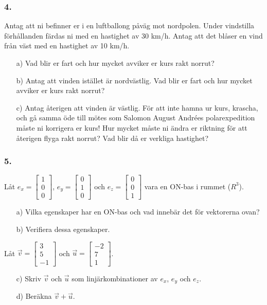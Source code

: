 \documentclass{article}
\begin{document}
\subsubsection*{4.}
Antag att ni befinner er i en luftballong påväg mot nordpolen. Under vindstilla förhållanden färdas ni med en hastighet av 30 km/h. Antag att det blåser en vind från väst med en hastighet av 10 km/h.
\begin{itemize}
\item[a) ] Vad blir er fart och hur mycket avviker er kurs rakt norrut?
\item[b) ] Antag att vinden istället är nordvästlig. Vad blir er fart och hur mycket avviker er kurs rakt norrut?
\item[c) ] Antag återigen att vinden är västlig. För att inte hamna ur kurs, krascha, och gå samma öde till mötes som Salomon August Andrées polarexpedition måste ni korrigera er kurs! Hur mycket måste ni ändra er riktning för att återigen flyga rakt norrut? Vad blir då er verkliga hastighet?
\end{itemize}

\subsubsection*{5.}
Låt $e_x = \begin{bmatrix} 1 \\ 0 \\ 0 \end{bmatrix}$, $e_y = \begin{bmatrix} 0 \\ 1 \\ 0 \end{bmatrix}$ och $e_z = \begin{bmatrix} 0 \\ 0 \\ 1 \end{bmatrix}$ vara en ON-bas i rummet ($R^3$).
\begin{itemize}
\item[a) ] Vilka egenskaper har en ON-bas och vad innebär det för vektorerna ovan?
\item[b) ] Verifiera dessa egenskaper.
\end{itemize}

Låt $\vec{v} = \begin{bmatrix} 3 \\ 5 \\ -1 \end{bmatrix}$ och $\vec{u} = \begin{bmatrix} -2 \\ 7 \\ 1 \end{bmatrix}$. 
\begin{itemize} 
\item[c) ] Skriv $\vec{v}$ och $\vec{u}$ som linjärkombinationer av $e_x$, $e_y$ och $e_z$.
\item[d) ] Beräkna $\vec{v} + \vec{u}$.
\end{itemize}
\end{document}
